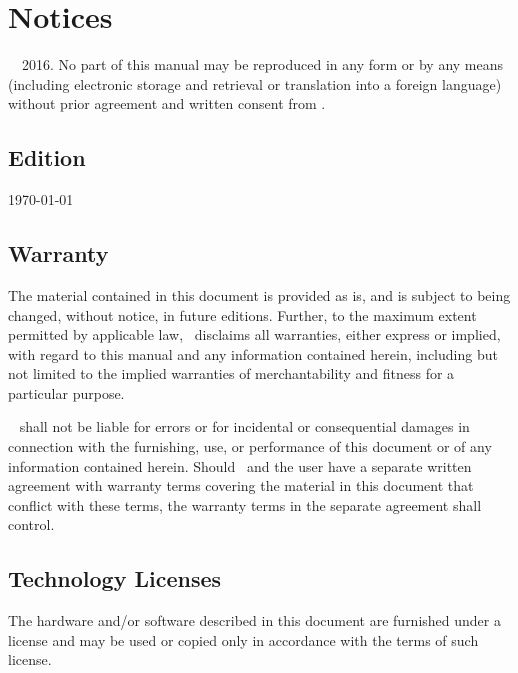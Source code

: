 
\thispagestyle{empty}
\section*{Notices}
\textcopyright~\docAuthor~2016.
No part of this manual may be reproduced in any form or by any means
(including electronic storage and retrieval or translation into a
foreign language) without prior agreement and written consent from \docAuthor.

\subsection*{Edition}
\today

\subsection*{Warranty}
The material contained in this document is provided \glqq as is\grqq, and is subject to
being changed, without notice, in future editions. Further, to the maximum extent
permitted by applicable law, \docAuthor~disclaims all warranties, either express or
implied, with regard to this manual and any information contained herein,
including but not limited to the implied warranties of merchantability and fitness
for a particular purpose.

\docAuthor~ shall not be liable for errors or for incidental
or consequential damages in connection with the furnishing, use, or performance of
this document or of any information contained herein. Should \docAuthor~and
the user have a separate written agreement with warranty terms covering the material
in this document that conflict with these terms, the warranty terms in the
separate agreement shall control.

\subsection*{Technology Licenses}
The hardware and/or software described in this document are furnished under a
license and may be used or copied only in accordance with the terms of such license.


